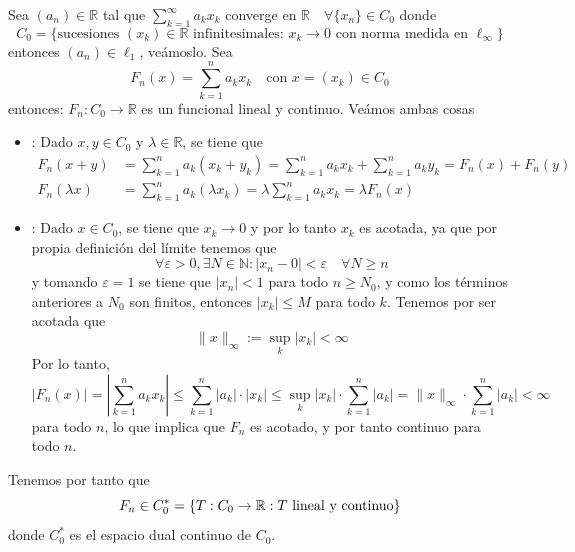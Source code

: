 \noindent Sea $(a_n) \in \mathbb{R}$ tal que $\sum\limits_{k=1}^{\infty} a_k x_k$ converge en $\mathbb{R} \quad \forall \{x_n\} \in C_0$ donde 
\begin{equation*}
    C_0 = \{ \text{sucesiones } (x_k) \in \mathbb{R} \text{ infinitesimales: } x_k \to 0 \text{ con norma medida en } \ell_\infty \}
\end{equation*}
entonces $(a_n) \in \ell_1$, veámoslo. Sea 
$$F_n(x) = \sum_{k=1}^{n} a_k x_k\quad \text{con } x = (x_k) \in C_0$$
entonces: $F_n: C_0 \to \mathbb{R}$ es un funcional lineal y continuo. Veámos ambas cosas
\begin{itemize}
    \item {}: Dado $x, y \in C_0$ y $\lambda \in \mathbb{R}$, se tiene que
    \begin{align*}
        F_n(x + y) &= \sum_{k=1}^{n} a_k (x_k + y_k) = \sum_{k=1}^{n} a_k x_k + \sum_{k=1}^{n} a_k y_k = F_n(x) + F_n(y) \\
        F_n(\lambda x) &= \sum_{k=1}^{n} a_k (\lambda x_k) = \lambda \sum_{k=1}^{n} a_k x_k = \lambda F_n(x)
    \end{align*}
    \item {}: Dado $x \in C_0$, se tiene que $x_k \to 0$ y por lo tanto $x_k$ es acotada, ya que por propia definición del límite tenemos que 
    \begin{equation*}
        \forall \varepsilon > 0, \exists N \in \mathbb{N} : |x_n-0| < \varepsilon \quad \forall N \geq n
    \end{equation*} 
    y tomando $\varepsilon = 1$ se tiene que $|x_n| < 1$ para todo $n \geq N_0$, y como los términos anteriores a $N_0$ son finitos, entonces $|x_k| \leq M$ para todo $k$. Tenemos por ser acotada que  
    $$\|x\|_{\infty} := \sup_{k} |x_k| < \infty$$ 
    Por lo tanto, 
    \begin{equation}\label{eq:Fn-continuo}
        |F_n(x)| = \left|\sum_{k=1}^{n} a_k x_k\right| \leq \sum_{k=1}^{n} |a_k| \cdot |x_k| \leq \sup_{k} |x_k| \cdot \sum_{k=1}^{n} |a_k| = \|x\|_{\infty} \cdot \sum_{k=1}^{n} |a_k| < \infty
    \end{equation}
    para todo $n$, lo que implica que $F_n$ es acotado, y por tanto continuo para todo $n$.
\end{itemize}
\noindent
Tenemos por tanto que 
\begin{equation*}
    F_n\in C_0^*=\{T:C_0\to \mathbb{R} : T \text{ lineal y continuo}\}
\end{equation*}
donde $C_0^*$ es el espacio dual continuo de $C_0$.
\vspace{0.3cm}

